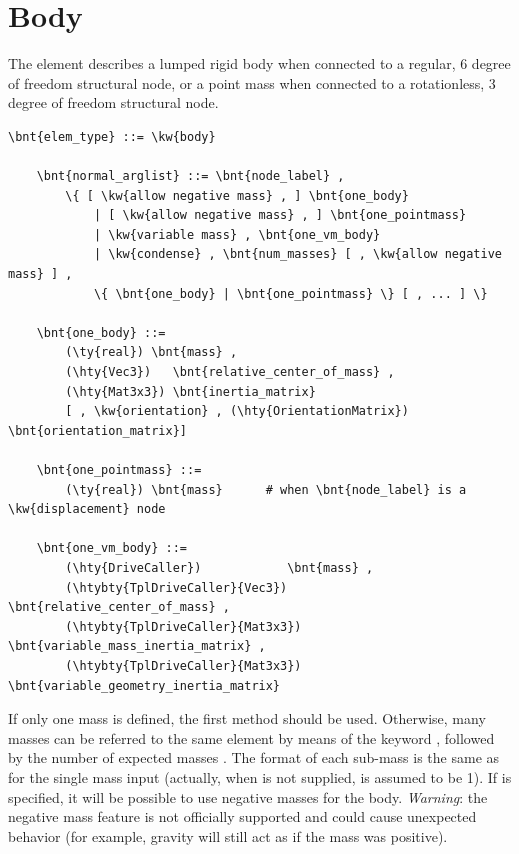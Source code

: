 \section{Body}
\label{sec:EL:BODY}
The  element describes a lumped rigid body when connected 
to a regular, 6 degree of freedom structural node, or a point mass
when connected to a rotationless, 3 degree of freedom structural node.
\begin{Verbatim}[commandchars=\\\{\}]
    \bnt{elem_type} ::= \kw{body}

    \bnt{normal_arglist} ::= \bnt{node_label} ,
        \{ [ \kw{allow negative mass} , ] \bnt{one_body}
            | [ \kw{allow negative mass} , ] \bnt{one_pointmass}
            | \kw{variable mass} , \bnt{one_vm_body}
            | \kw{condense} , \bnt{num_masses} [ , \kw{allow negative mass} ] ,
	        \{ \bnt{one_body} | \bnt{one_pointmass} \} [ , ... ] \}

    \bnt{one_body} ::=
        (\ty{real}) \bnt{mass} , 
        (\hty{Vec3})   \bnt{relative_center_of_mass} ,
        (\hty{Mat3x3}) \bnt{inertia_matrix}
        [ , \kw{orientation} , (\hty{OrientationMatrix}) \bnt{orientation_matrix}]

    \bnt{one_pointmass} ::=
        (\ty{real}) \bnt{mass}      # when \bnt{node_label} is a \kw{displacement} node

    \bnt{one_vm_body} ::=
        (\hty{DriveCaller})            \bnt{mass} ,
        (\htybty{TplDriveCaller}{Vec3})   \bnt{relative_center_of_mass} ,
        (\htybty{TplDriveCaller}{Mat3x3}) \bnt{variable_mass_inertia_matrix} ,
        (\htybty{TplDriveCaller}{Mat3x3}) \bnt{variable_geometry_inertia_matrix}
\end{Verbatim}
If only one mass is defined, the first method should be used. Otherwise,
many masses can be referred to the same element by means of the keyword
, followed by the number of expected masses .
The format of each sub-mass is the same as for the single mass input (actually, 
when  is not supplied,  is assumed to be 1).
If  is specified, it will be possible to use
negative masses for the body. \textit{Warning}: the negative mass feature
is not officially supported and could cause unexpected behavior (for
example, gravity will still act as if the mass was positive).

